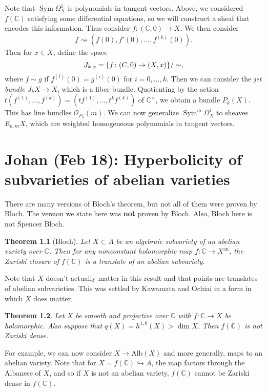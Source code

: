 \documentclass[leqno, openany]{memoir}
\newtheorem{thm}{Theorem}[section]
\theoremstyle{definition}
\theoremstyle{remark}
\theoremstyle{plain}
\theoremstyle{definition}
\theoremstyle{remark}
\newcommand{\C}{\mathbb{C}}
\newcommand{\mc}[1]{\mathcal{#1}}
\newcommand{\mr}[1]{\mathrm{#1}}
\newcommand{\on}[1]{\operatorname{#1}}
\newcommand{\ol}[1]{\overline{#1}}
\newcommand{\wt}[1]{\widetilde{#1}}
\begin{document}
Note that $\on{Sym} \Omega^1_X$ is polynomials in tangent vectors. Above, we considered $\wt{f}(\C)$ satisfying some differential equations, so we will construct a sheaf that encodes this information. Thus consider $f \colon (\C, 0) \to X$. We then consider
\[ f \rightsquigarrow (f(0), f'(0), \ldots, f^{(k)}(0)). \]
Then for $x \in X$, define the space
\[ J_{k,x} = \qty{f \colon (C, 0) \to (X, x)} / \sim, \]
where $f \sim g$ if $f^{(i)}(0) = g^{(i)}(0)$ for $i = 0, \ldots, k$. Then we can consider the \textit{jet bundle} $J_k X \to X$, which is a fiber bundle. Quotienting by the action $t (f^{(1)}, \ldots, f^{(k)}) = (t f^{(1)}, \ldots, t^k f^{(k)})$ of $\C^{\times}$, we obtain a bundle $P_k(X)$. This has line bundles $\mc{O}_{P_k}(m)$. We can now generalize $\on{Sym}^m \Omega^1_X$ to sheaves $E_{k,m} X$, which are weighted homogeneous polynomials in tangent vectors.

\chapter{Johan (Feb 18): Hyperbolicity of subvarieties of abelian varieties}%

There are many versions of Bloch's theorem, but not all of them were proven by Bloch. The version we state here was \textbf{not} proven by Bloch. Also, Bloch here is not Spencer Bloch.

\begin{thm}[Bloch]
    Let $X \subset A$ be an algebraic subvariety of an abelian variety over $\C$. Then for any nonconstant holomorphic map $f \colon \C \to X^{\mr{an}}$, the Zariski closure of $f(\C)$ is a translate of an abelian subvariety.
\end{thm}

Note that $X$ doesn't actually matter in this result and that points are translates of abelian subvarieties. This was settled by Kawamata and Ochiai in a form in which $X$ does matter.

\begin{thm}
    Let $X$ be smooth and projective over $\C$ with $f \colon \C \to X$ be holomorphic. Also suppose that $q(X) = h^{1,0}(X) > \dim X$. Then $f(\C)$ is not Zariski dense.
\end{thm}

For example, we can now consider $X \to \mr{Alb}(X)$ and more generally, maps to an abelian variety. Note that for $X = \ol{f(\C)} \hookrightarrow A$, the map factors through the Albanese of $X$, and so if $X$ is not an abelian variety, $f(\C)$ cannot be Zariski dense in $\ol{f(\C)}$.
\end{document}
